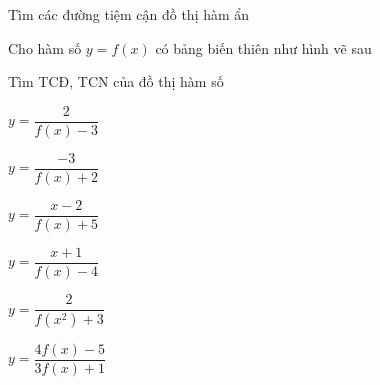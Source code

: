\begin{dang}{Tìm các đường tiệm cận đồ thị hàm ẩn}
\end{dang}
\begin{vd}
    Cho hàm số $y=f(x)$ có bảng biến thiên như hình vẽ sau
    \begin{center}
    \end{center}
    Tìm TCĐ, TCN của đồ thị hàm số
    \begin{listEX}[3]
        \item $y=\dfrac{2}{f(x)-3}$
        \item $y=\dfrac{-3}{f(x)+2}$
        \item $y=\dfrac{x-2}{f(x)+5}$
        \item $y=\dfrac{x+1}{f(x)-4}$
        \item $y=\dfrac{2}{f(x^2)+3}$
        \item $y=\dfrac{4f(x)-5}{3f(x)+1}$
    \end{listEX}
    \loigiai{}
\end{vd}
